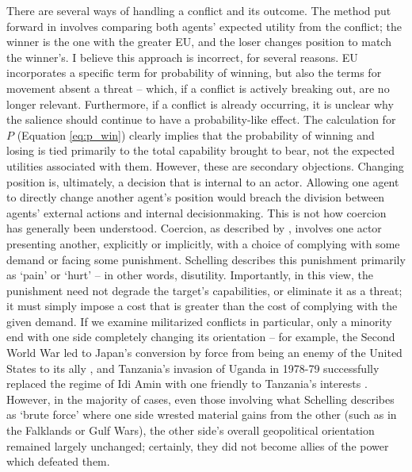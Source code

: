 There are several ways of handling a conflict and its outcome. The method put forward in \citet{scholz_2011} involves comparing both agents' expected utility from the conflict; the winner is the one with the greater EU, and the loser changes position to match the winner's. I believe this approach is incorrect, for several reasons. EU incorporates a specific term for probability of winning, but also the terms for movement absent a threat -- which, if a conflict is actively breaking out, are no longer relevant. Furthermore, if a conflict is already occurring, it is unclear why the salience should continue to have a probability-like effect. The calculation for $P$ (Equation \ref{eq:p_win}) clearly implies that the probability of winning and losing is tied primarily to the total capability brought to bear, not the expected utilities associated with them.
However, these are secondary objections. Changing position is, ultimately, a decision that is internal to an actor. Allowing one agent to directly change another agent's position would breach the division between agents' external actions and internal decisionmaking. This is not how coercion has generally been understood. Coercion, as described by \citet{schelling_1966}, involves one actor presenting another, explicitly or implicitly, with a choice of complying with some demand or facing some punishment. Schelling describes this punishment primarily as  `pain' or `hurt' -- in other words, disutility. Importantly, in this view, the punishment need not degrade the target's capabilities, or eliminate it as a threat; it must simply impose a cost that is greater than the cost of complying with the given demand. If we examine militarized conflicts in particular, only a minority end with one side completely changing its orientation -- for example, the Second World War led to Japan's conversion by force from being an enemy of the United States to its ally \citep{schaller_1997}, and Tanzania's invasion of Uganda in 1978-79 successfully replaced the regime of Idi Amin with one friendly to Tanzania's interests \citep{acheson_2001}. However, in the majority of cases, even those involving what Schelling describes as `brute force' where one side wrested material gains from the other (such as in the Falklands or Gulf Wars), the other side's overall geopolitical orientation remained largely unchanged; certainly, they did not become allies of the power which defeated them.

